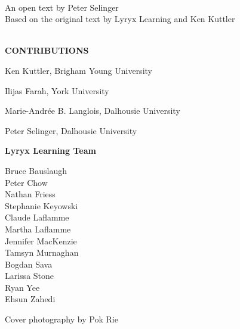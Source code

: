 \thispagestyle{empty}

\begin{center}
  {\fontsize{24pt}{22pt}\selectfont \textcolor{titletextcolour}{\booksubtitle\;\booktitle}} \\
  \bigskip
  {\fontsize{18pt}{20pt}\selectfont An open text by Peter Selinger} \\
  \bigskip
  {\fontsize{16pt}{20pt}\selectfont Based on the original text by Lyryx Learning and Ken Kuttler} \\
  \bigskip
  {\fontsize{16pt}{20pt}\selectfont \edition} \\
\end{center}

\setlength{\parskip}{0pt}

\vfill

\begin{center}
  \fontsize{14pt}{16pt}\selectfont\textcolor{titletextcolour}{\textbf{CONTRIBUTIONS}}
\end{center}

{\small

  \begin{center}
    Ken Kuttler, Brigham Young University
    \bigskip

    Ilijas Farah, York University
    \smallskip

    Marie-Andr\'ee B. Langlois, Dalhousie University
    \smallskip

    Peter Selinger, Dalhousie University

    \bigskip
    \textbf{Lyryx Learning Team}
    \vspace{-1em}

    \begin{multicols}{2}
      Bruce Bauslaugh \\
      Peter Chow \\
      Nathan Friess \\
      Stephanie Keyowski \\
      Claude Laflamme \\
      Martha Laflamme \\
      Jennifer MacKenzie \\
      Tamsyn Murnaghan \\
      Bogdan Sava \\
      Larissa Stone \\
      Ryan Yee \\
      Ehsun Zahedi \\
    \end{multicols}
    \vspace{0.5in}
    
    Cover photography by Pok Rie
  \end{center}
}

